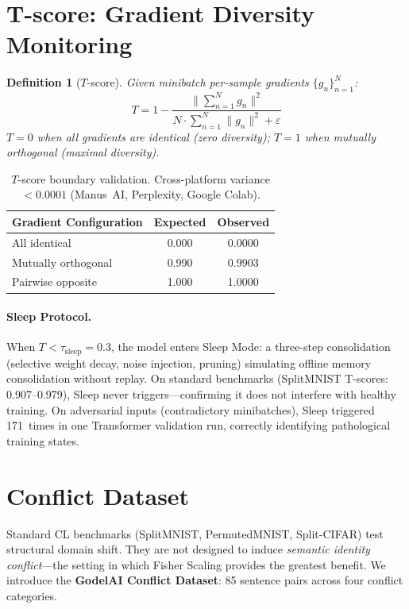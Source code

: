 \documentclass[12pt]{article}
\newtheorem{definition}{Definition}[section]
\newcommand{\tscore}{$T$\nobreakdash-score\xspace}
\begin{document}
\section{T-score: Gradient Diversity Monitoring}
\label{sec:tscore}

\begin{definition}[\tscore{}]
  Given minibatch per-sample gradients $\{g_n\}_{n=1}^{N}$:
  \[
    T = 1 - \frac{\bigl\|\sum_{n=1}^N g_n\bigr\|^2}
                 {N \cdot \sum_{n=1}^N \|g_n\|^2 + \varepsilon}
  \]
  $T{=}0$ when all gradients are identical (zero diversity);
  $T{=}1$ when mutually orthogonal (maximal diversity).
\end{definition}

\begin{table}[ht]
\centering
\caption{\tscore{} boundary validation. Cross-platform variance $<0.0001$
  (Manus~AI, Perplexity, Google Colab).}
\label{tab:tscore}
\begin{tabular}{lcc}
\toprule
\textbf{Gradient Configuration} & \textbf{Expected} & \textbf{Observed} \\
\midrule
All identical      & 0.000 & 0.0000 \\
Mutually orthogonal & 0.990 & 0.9903 \\
Pairwise opposite  & 1.000 & 1.0000 \\
\bottomrule
\end{tabular}
\end{table}

\paragraph{Sleep Protocol.}
When $T < \tau_{\mathrm{sleep}}{=}0.3$, the model enters Sleep Mode: a
three-step consolidation (selective weight decay, noise injection, pruning)
simulating offline memory consolidation without replay.
On standard benchmarks (SplitMNIST T-scores: 0.907--0.979), Sleep never
triggers---confirming it does not interfere with healthy training.
On adversarial inputs (contradictory minibatches), Sleep triggered
171~times in one Transformer validation run, correctly identifying
pathological training states.

\section{Conflict Dataset}
\label{sec:conflict}

Standard CL benchmarks (SplitMNIST, PermutedMNIST, Split-CIFAR) test
structural domain shift. They are not designed to induce \emph{semantic
identity conflict}---the setting in which Fisher Scaling provides the greatest
benefit.
We introduce the \textbf{GodelAI Conflict Dataset}: 85 sentence pairs across
four conflict categories.
\end{document}
